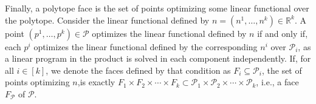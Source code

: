 \documentclass[10pt,a4paper]{amsart}
\newcommand{\R}{\mathbb{R}}
\newcommand{\mP}{\mathcal{P}}
\renewenvironment{proof}%
{%
 \par\noindent{\bfseries\upshape \proofname\ }%
}%
{\jmlrQED}
\newcommand{\verts}[1]{\mathcal{V}_{#1}}
\begin{document}
\begin{proof}
Finally, a polytope face is the set of points optimizing some linear functional over the polytope.
Consider the linear functional defined by $n = (n^1, \ldots, n^k) \in \R^k$.
A point $(p^1, \ldots, p^k) \in \mP$ optimizes the linear functional defined by $n$ if and only if, each $p^i$ optimizes the linear functional defined by the corresponding $n^i$ over $\mP_i$, as a linear program in the product is solved in each component independently.
If, for all $i \in [k]$, we denote the faces defined by that condition as $F_i \subseteq \mP_i$, the set of points optimizing $n$,is exactly $F_1 \times F_2 \times \cdots \times F_k \subset \mP_1 \times \mP_2 \times \cdots \times \mP_k$, i.e., a face $F_\mP$ of $\mP$.
\end{proof}
\end{document}

